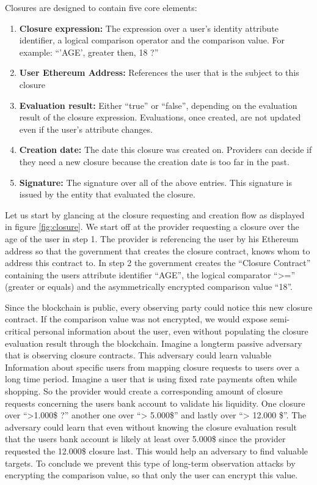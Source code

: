 \noindent Closures are designed to contain five core elements:
\begin{enumerate}
\item \textbf{Closure expression:} The expression over a user’s identity attribute identifier, a logical comparison operator and the comparison value. For example: “’AGE’, greater then, 18 ?”
\item \textbf{User Ethereum Address:} References the user that is the subject to this closure
\item \textbf{Evaluation result:} Either “true” or “false”, depending on the evaluation result of the closure expression. Evaluations, once created, are not updated even if the user’s attribute changes.
\item \textbf{Creation date:} The date this closure was created on. Providers can decide if they need a new closure because the creation date is too far in the past.
\item \textbf{Signature:} The signature over all of the above entries. This signature is issued by the entity that evaluated the closure.
\end{enumerate}

Let us start by glancing at the closure requesting and creation flow as displayed in figure \ref{fig:closure}. We start off at the provider requesting a closure over the age of the user in step 1.
The provider is referencing the user by his Ethereum address so that the government that creates the closure contract, knows whom to address this contract to. In step 2 the government creates the “Closure Contract” containing the users attribute identifier “AGE”, the logical comparator “>=” (greater or equals) and the asymmetrically encrypted comparison value “18”.

Since the blockchain is public, every observing party could notice this new closure contract. If the comparison value was not encrypted, we would expose semi-critical personal information about the user, even without populating the closure evaluation result through the blockchain. Imagine a longterm passive adversary that is observing closure contracts. This adversary could learn valuable Information about specific users from mapping closure requests to users over a long time period. Imagine a user that is using fixed rate payments often while shopping. So the provider would create a corresponding amount of closure requests concerning the users bank account to validate his liquidity. One closure over “>1.000\$ ?”  another one over “> 5.000\$” and lastly over “> 12.000 \$”. The adversary could learn that even without knowing the closure evaluation result that the users bank account is likely at least over 5.000\$ since the provider requested the 12.000\$ closure last. This would help an adversary to find valuable targets.
To conclude we prevent this type of long-term observation attacks by encrypting the comparison value, so that only the user can encrypt this value.

